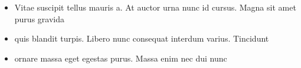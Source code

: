 \documentclass[10pt,a4paper,ragged2e]{altacv}
\begin{document}
\begin{itemize}
\item Vitae suscipit tellus mauris a. At auctor urna nunc id cursus. Magna sit amet purus gravida
\item quis blandit turpis. Libero nunc consequat interdum varius. Tincidunt
\item ornare massa eget egestas purus. Massa enim nec dui nunc
\end{itemize}

\clearpage
\nocite{*}
\end{document}

